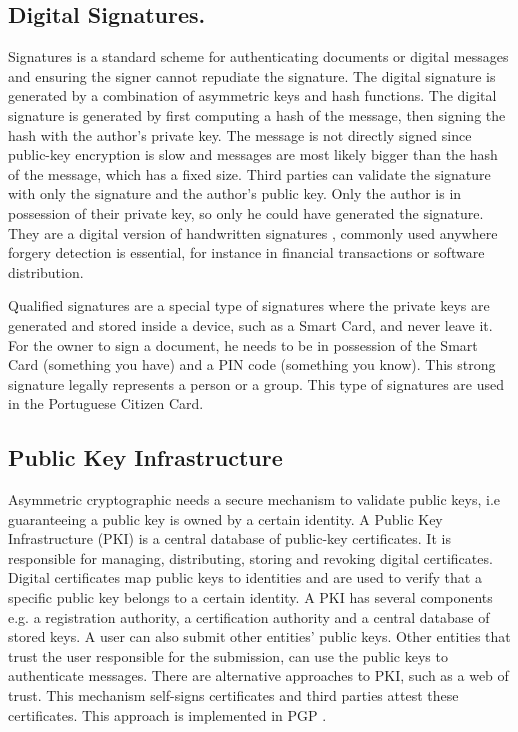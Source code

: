 \subsection{Digital Signatures.} \label{chap:background:crypto:signatures}

Signatures is a standard scheme for authenticating documents or digital messages and ensuring the signer cannot repudiate the signature. The digital signature is generated by a combination of asymmetric keys and hash functions.
The digital signature is generated by first computing a hash of the message, then signing the hash with the author's private key. The message is not directly signed since public-key encryption is slow and messages are most likely bigger than the hash of the message, which has a fixed size. Third parties can validate the signature with only the signature and the author's public key. Only the author is in possession of their private key, so only he could have generated the signature.
They are a digital version of handwritten signatures \cite{digitalsignatures}, commonly used anywhere forgery detection is essential, for instance in financial transactions or software distribution.

Qualified signatures are a special type of signatures where the private keys are generated and stored inside a device, such as a Smart Card, and never leave it. For the owner to sign a document, he needs to be in possession of the Smart Card (something you have) and a PIN code (something you know). This strong signature legally represents a person or a group. This type of signatures are used in the Portuguese Citizen Card.

\subsection{Public Key Infrastructure} \label{chap:background:PKI}

Asymmetric cryptographic needs a secure mechanism to validate public keys, i.e guaranteeing a public key is owned by a certain identity.
A Public Key Infrastructure (PKI) is a central database of public-key certificates. It is responsible for managing, distributing, storing and revoking digital certificates. Digital certificates map public keys to identities and are used to verify that a specific public key belongs to a certain identity.
A PKI has several components e.g. a registration authority, a certification authority and a central database of stored keys.
A user can also submit other entities' public keys. Other entities that trust the user responsible for the submission, can use the public keys to authenticate messages.
There are alternative approaches to PKI, such as a web of trust. This mechanism self-signs certificates and third parties attest these certificates. This approach is implemented in PGP \cite{modelingPKI}.

